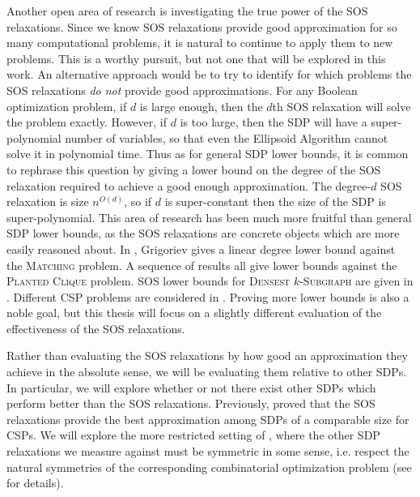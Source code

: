 Another open area of research is investigating the true power of the SOS relaxations.
Since we know SOS relaxations provide good approximation for so many computational problems, it is natural to continue to apply them to new problems.
This is a worthy pursuit, but not one that will be explored in this work.
An alternative approach would be to try to identify for which problems the SOS relaxations \emph{do not} provide good approximations.
For any Boolean optimization problem, if $d$ is large enough, then the $d$th SOS relaxation will solve the problem exactly.
However, if $d$ is too large, then the SDP will have a super-polynomial number of variables, so that even the Ellipsoid Algorithm cannot solve it in polynomial time.
Thus as for general SDP lower bounds, it is common to rephrase this question by giving a lower bound on the degree of the SOS relaxation required to achieve a good enough approximation.
The degree-$d$ SOS relaxation is size $n^{O(d)}$, so if $d$ is super-constant then the size of the SDP is super-polynomial.
This area of research has been much more fruitful than general SDP lower bounds, as the SOS relaxations are concrete objects which are more easily reasoned about. 
In \cite{Gri01}, Grigoriev gives a linear degree lower bound against the \textsc{Matching} problem. A sequence of results \cite{MPW15, DM15, RS15, HKP15,BHKKMP16} all give lower bounds against the \textsc{Planted Clique} problem. SOS lower bounds for \textsc{Densest $k$-Subgraph} are given in \cite{BCVGZ12}. Different \textsc{CSP} problems are considered in \cite{Sch08,RS09, GMT09,Tul09,LRS15}.
Proving more lower bounds is also a noble goal, but this thesis will focus on a slightly different evaluation of the effectiveness of the SOS relaxations.


Rather than evaluating the SOS relaxations by how good an approximation they achieve in the absolute sense, we will be evaluating them relative to other SDPs.
In particular, we will explore whether or not there exist other SDPs which perform better than the SOS relaxations.
Previously, \cite{LRST14,LRS15}  proved that the SOS relaxations provide the best approximation among SDPs of a comparable size for CSPs. We will explore the more restricted setting of \cite{LRST14}, where the other SDP relaxations we measure against must be symmetric in some sense, i.e. respect the natural symmetries of the corresponding combinatorial optimization problem (see  for details). 

